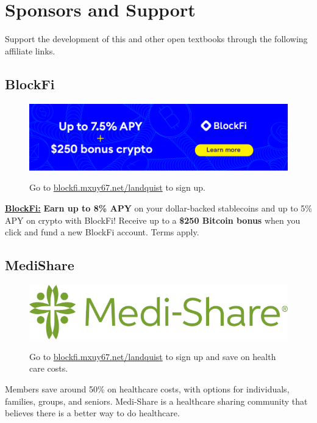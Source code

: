 \chapter*{Sponsors and Support}

Support the development of this and other open textbooks through the following affiliate links.

\section*{BlockFi}
\begin{figure}[!ht]
    \centering
    \href{https://blockfi.mxuy67.net/c/2612759/907789/10568}{\includegraphics[width=\textwidth]{img/support/blockFi/blockfi-banner3.png}}
    \caption{Go to \href{https://blockfi.mxuy67.net/c/2612759/907789/10568}{blockfi.mxuy67.net/landquist} to sign up.}
\end{figure}

\noindent \href{https://blockfi.mxuy67.net/c/2612759/907789/10568}{{\bf BlockFi:}} {\bf Earn up to 8\% APY} on your dollar-backed stablecoins and up to 5\% APY on crypto with BlockFi! Receive up to a {\bf \$250 Bitcoin bonus} when you click and fund a new BlockFi account. Terms apply.

\section*{MediShare}
\begin{figure}[!ht]
    \centering
    \href{https://bit.ly/3pP7ruB}{\includegraphics[width=\textwidth]{img/support/medishare/Medi-ShareLogo.jpg}}
    \caption{Go to \href{https://bit.ly/3pP7ruB}{blockfi.mxuy67.net/landquist} to sign up and save on health care costs.}
\end{figure}
\noindent Members save around 50\% on healthcare costs, with options for individuals, families, groups, and seniors. Medi-Share is a healthcare sharing community that believes there is a better way to do healthcare.


